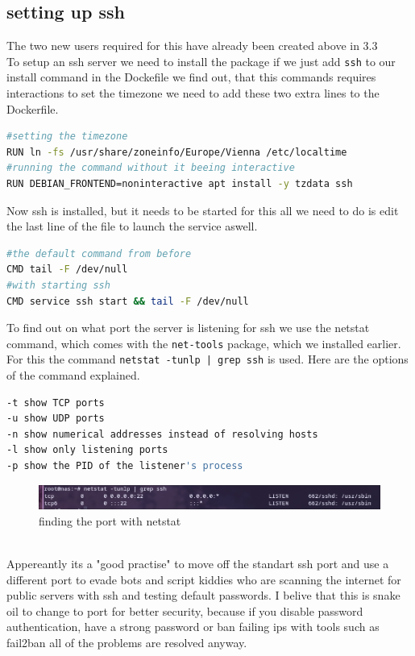 \documentclass[a4paper]{article}
\begin{document}
\subsection {setting up ssh}
The two new users required for this have already been created above in 3.3 \\
To setup an ssh server we need to install the package if we just add \texttt{ssh} to our install command in the Dockefile we find out, that this commands requires interactions to set the timezone we need to add these two extra lines to the Dockerfile.
\begin{lstlisting}[language=bash]
#setting the timezone
RUN ln -fs /usr/share/zoneinfo/Europe/Vienna /etc/localtime
#running the command without it beeing interactive
RUN DEBIAN_FRONTEND=noninteractive apt install -y tzdata ssh
\end{lstlisting}
Now ssh is installed, but it needs to be started for this all we need to do is edit the last line of the file to launch the service aswell.
\begin{lstlisting}[language=bash]
#the default command from before
CMD tail -F /dev/null
#with starting ssh
CMD service ssh start && tail -F /dev/null
\end{lstlisting}
To find out on what port the server is listening for ssh we use the netstat command, which comes with the \texttt{net-tools} package, which we installed earlier.
For this the command \texttt{netstat -tunlp | grep ssh} is used. Here are the options of the command explained.
\begin{lstlisting}[language=bash]
-t show TCP ports
-u show UDP ports
-n show numerical addresses instead of resolving hosts
-l show only listening ports
-p show the PID of the listener's process
\end{lstlisting}\cite{netstat}
\begin{figure}[h]
	\centering
	\includegraphics[scale=0.4]{images/netstatssh.png}
	\caption{finding the port with netstat}
\end{figure} \\
Appereantly its a "good practise" to move off the standart ssh port and use a different port to evade bots and script kiddies who are scanning the internet for public servers with ssh and testing default passwords. I belive that this is snake oil to change to port for better security, because if you disable password authentication, have a strong password or ban failing ips with tools such as fail2ban all of the problems are resolved anyway.\cite{hardening-linux-video} \\
\end{document}
